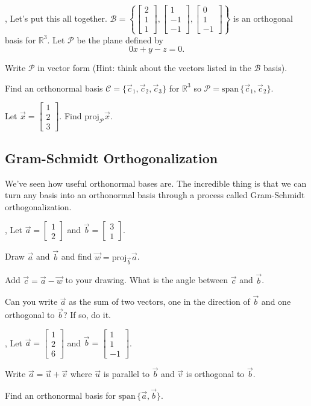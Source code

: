 \documentclass{article}
\newcommand{\R}{\mathbb{R}}
\newcommand{\proj}{\mathrm{proj}}
\renewcommand{\span}{\mathrm{span}\,}
\newcommand{\mat}[1]{\begin{bmatrix}#1\end{bmatrix}}
\begin{document}
	\sep
	Let's put this all together.  
	$\mathcal B=\left\{\mat{2\\1\\1},\mat{1\\-1\\-1},\mat{0\\1\\-1}\right\}$ is an
	orthogonal basis for $\R^3$.  Let $\mathcal P$ be the plane defined
	by
	\[
		0x+y-z=0.
	\]
	\begin{Enum}
		\item Write $\mathcal P$ in vector form (Hint: think about the vectors
			listed in the $\mathcal B$ basis).
		\item Find an orthonormal basis $\mathcal C=\{\vec c_1,\vec c_2,\vec c_3\}$
			for $\R^3$ so $\mathcal P=\span\{\vec c_1,\vec c_2\}$.
		\item Let $\vec x=\mat{1\\2\\3}$.  Find $\proj_{\mathcal P}\vec x$.
	\end{Enum}

\subsection*{Gram-Schmidt Orthogonalization}
	We've seen how useful orthonormal bases are.  The incredible thing is that we can 
	turn any basis into an orthonormal basis through a process called
	Gram-Schmidt orthogonalization.

	\sep
	Let $\vec a=\mat{1\\2}$ and $\vec b=\mat{3\\1}$.
	\begin{Enum}
		\item Draw $\vec a$ and $\vec b$ and find $\vec w=\proj_{\vec b}\vec a$.
		\item Add $\vec c=\vec a-\vec w$ to your drawing.  What is the angle between
			$\vec c$ and $\vec b$.
		\item Can you write $\vec a$ as the sum of two vectors, one in 
			the direction of $\vec b$ and one orthogonal to $\vec b$?
			If so, do it.
	\end{Enum}

	\sep
	Let $\vec a=\mat{1\\2\\6}$ and $\vec b=\mat{1\\1\\-1}$.
	\begin{Enum}
		\item Write $\vec a=\vec u+\vec v$ where $\vec u$ is parallel to
			$\vec b$ and $\vec v$ is orthogonal to $\vec b$.
		\item Find an orthonormal basis for $\span\{\vec a,\vec b\}$.
	\end{Enum}
\end{document}
